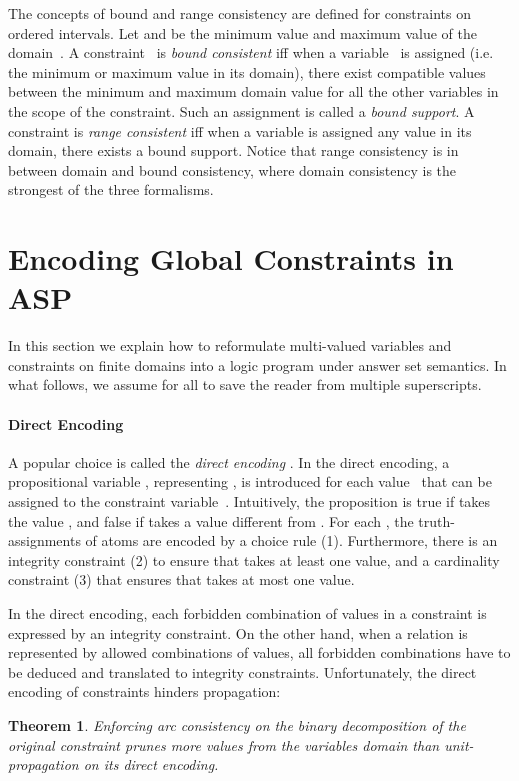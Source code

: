 \documentclass[letterpaper]{article}
\newtheorem{theorem}{Theorem}
\begin{document}
The concepts of bound and range consistency are defined for constraints on ordered intervals.
Let  and  be the minimum value and maximum value of the domain~. A constraint~ is \emph{bound consistent} iff when a variable~ is assigned  (i.e. the minimum or maximum value in its domain), there exist compatible values between the minimum and maximum domain value for all the other variables in the scope of the constraint. Such an assignment is called a \emph{bound support}. A constraint is \emph{range consistent} iff when a variable is assigned any value in its domain, there exists a bound support. Notice that range consistency is in between domain and bound consistency, where domain consistency is the strongest of the three formalisms.


\section{Encoding Global Constraints in ASP}
In this section we explain how to reformulate multi-valued variables and constraints on finite domains into a logic program under answer set semantics. In what follows, we assume  for all  to save the reader from multiple superscripts.

\paragraph{Direct Encoding}
A popular choice is called the \emph{direct encoding} \cite{wa00}. In the direct encoding, a propositional variable , representing , is introduced for each value~ that can be assigned to the constraint variable~. Intuitively, the proposition  is true if  takes the value , and false if  takes a value different from . For each , the truth-assignments of atoms  are encoded by a choice rule (1). Furthermore, there is an integrity constraint (2) to ensure that  takes at least one value, and a cardinality constraint (3) that ensures that  takes at most one value.

In the direct encoding, each forbidden combination of values in a constraint is expressed by an integrity constraint. On the other hand, when a relation is represented by allowed combinations of values, all forbidden combinations have to be deduced and translated to integrity constraints. Unfortunately, the direct encoding of constraints hinders propagation:
\begin{theorem}
Enforcing arc consistency on the binary decomposition of the original constraint prunes more values from the variables domain than unit-propagation on its direct encoding.
\end{theorem}
\end{document}
